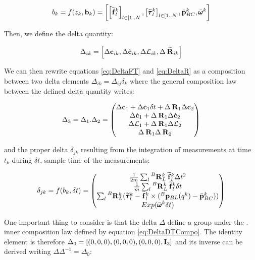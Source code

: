 \documentclass[11pt]{article}
\newcommand{\Rot}[2]{\prescript{#1}{}{\bfR}_{#2}}
\newcommand{\Rotm}[2]{\prescript{#1}{}{\widetilde{\bfR}}_{#2}}
\newcommand{\bias}{\bfb}
\newcommand{\posi}[2]{\prescript{#1}{}{\bfp}_{#2}}
\newcommand{\posibar}{\bar{\bfp}}
\newcommand{\angvelbar}{\bar{\pmb{\omega}}}
\newcommand{\forcem}[2]{\prescript{#1}{}{\widetilde{\bff}}_{#2}}
\newcommand{\torquem}[2]{\prescript{#1}{}{\widetilde{\pmb{\tau}}}_{#2}}
\newcommand{\AM}{\mathcal{L}}
\newcommand{\COM}{\bfc}
\newcommand{\COMd}{\dot{\bfc}}
\newcommand{\Ident}{\bfI}
\begin{document}
\begin{equation}
    b_k = f(z_k, \bias_k) = \left[ \left[\forcem{}{l}^k \right]_{l \in [1..N}, \left[\torquem{}{l}^k \right]_{l \in [1..N}, \posibar_{BC}^k, \angvelbar^k \right]
\end{equation}

Then, we define the delta quantity:

\begin{equation}
    \Delta_{ik} = \left[ \Delta \COM_{ik}, \Delta \COMd_{ik}, \Delta \AM_{ik}, \Delta \Rotm{}{ik} \right]
\end{equation}

We can then rewrite equations  \ref{eq:DeltaFT} and \ref{eq:DeltaR} as a composition between two delta elements $\Delta_{ik} = \Delta_{ij} \delta_k$ where the general composition law between the defined delta quantity writes:

\begin{equation}
    \Delta_3 = \Delta_1 . \Delta_2 = 
    \begin{pmatrix}
    \Delta \COM_1 + \Delta \COMd_1 \delta t + \Delta \Rot{}{1}  \Delta \COM_2
    \\
    \Delta \COMd_1 + \Delta \Rot{}{1}  \Delta \COMd_2
    \\
    \Delta \AM_1 + \Delta \Rot{}{1}  \Delta \AM_2
    \\
    \Delta \Rot{}{1}\Delta \Rot{}{2}
    \end{pmatrix}
    \label{eq:DeltaDTCompo}
\end{equation}

and the proper delta $\delta_{jk}$ resulting from the integration of measurements at time $t_k$ during $\delta t$, sample time of the measurements:

\begin{equation}
    \delta_{jk} =
    f(b_k, \delta t) =
    \begin{pmatrix}
    \frac{1}{2m} \sum_l \Rot{B}{L}^{k} \forcem{}{l}^{k} \Delta t^2
    \\
    \frac{1}{m} \sum_l \Rot{B}{L}^{k} \forcem{}{l}^{k} \delta t 
    \\
    \sum_l \Rot{B}{L}^{k} (\torquem{}{l}^{k} - \forcem{}{l}^{k} \times (\posi{B}{BL}(q^k) - \posibar_{BC}^k))
    \\
    Exp(\angvelbar^k\delta t)
    \end{pmatrix}
\end{equation}

One important thing to consider is that the delta $\Delta$ define a group under the $.$ inner composition law defined by equation \ref{eq:DeltaDTCompo}. The identity element is therefore $\Delta_0 = \left[ (0,0,0), (0,0,0), (0,0,0), \Ident_3 \right]$ and its inverse can be derived writing $\Delta \Delta^{-1} = \Delta_0$:
\end{document}

